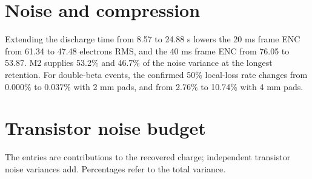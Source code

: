 \documentclass[10pt,a4paper]{article}
\begin{document}
\section{Noise and compression}
Extending the discharge time from 8.57 to 24.88 s lowers the 20 ms frame ENC from 61.34 to 47.48 electrons RMS, and the 40 ms frame ENC from 76.05 to 53.87. M2 supplies 53.2\% and 46.7\% of the noise variance at the longest retention. For double-beta events, the confirmed 50\% local-loss rate changes from 0.000\% to 0.037\% with 2 mm pads, and from 2.76\% to 10.74\% with 4 mm pads.

\section{Transistor noise budget}
The entries are contributions to the recovered charge; independent transistor
noise variances add. Percentages refer to the total variance.
\end{document}
